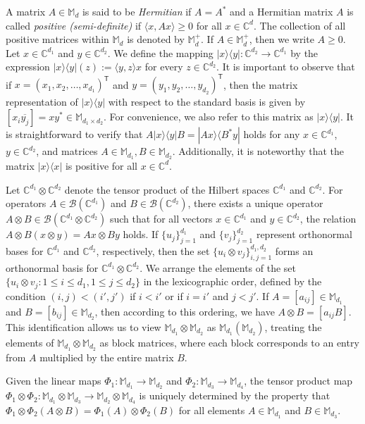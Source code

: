 \documentclass[10pt,reqno]{amsart}
\theoremstyle{definition}
\theoremstyle{plain}
\theoremstyle{remark}
\renewcommand{\sf}[1]{\textsf{#1}}
\newcommand{\mbb}[1]{\mathbb{#1}}
\newcommand{\msc}[1]{\mathscr{#1}}
\newcommand{\M}[1]{\mbb{M}_{#1}}%
\newcommand{\B}[1]{\msc{B}({#1})}
\newcommand{\ranko}[2]{|{#1}\rangle\langle{#2}|}
\newcommand{\ip}[1]{\langle#1\rangle}
\DeclareMathOperator{\T}{\sf{T}}
\numberwithin{equation}{section}%
\begin{document}
A matrix $A\in\M{d}$ is said to be \textit{Hermitian} if $A=A^*$ and a Hermitian matrix $A$ is called \textit{positive (semi-definite)} if $\ip{x,Ax}\geq 0$ for all $x\in \mbb{C}^d$. The collection of all positive matrices within $\M{d}$ is denoted by $\M{d}^+$. If $A\in\M{d}^+$, then we write $A\geq 0$. Let $x\in\mbb{C}^{d_1}$ and $y\in\mbb{C}^{d_2}$. We define the mapping $\ranko{x}{y}:\mbb{C}^{d_2}\to\mbb{C}^{d_1}$ by the expression $\ranko{x}{y}(z):=\ip{y,z}x$ for every $z\in\mbb{C}^{d_2}$. It is important to observe that if $x=(x_1,x_2,\ldots,x_{d_1})^{\T}$ and $y=(y_1,y_2,\ldots,y_{d_2})^{\T}$, then the matrix representation of $\ranko{x}{y}$ with respect to the standard basis is given by $[x_i\overline{y_j}]=xy^*\in\M{d_1\times d_2}$. For convenience, we also refer to this matrix as $\ranko{x}{y}$. It is straightforward to verify that $A\ranko{x}{y}B=\ranko{Ax}{B^*y}$ holds for any $x\in\mbb{C}^{d_1}$, $y\in\mbb{C}^{d_2}$, and matrices $A\in\M{d_1}, B\in\M{d_2}$. Additionally, it is noteworthy that the matrix $\ranko{x}{x}$ is positive for all $x\in\mbb{C}^{d}$.



Let $\mbb{C}^{d_1}\otimes\mbb{C}^{d_2}$ denote the tensor product of the Hilbert spaces $\mbb{C}^{d_1}$ and $\mbb{C}^{d_2}$. For operators $A\in\B{\mbb{C}^{d_1}}$ and $B\in\B{\mbb{C}^{d_2}}$, there exists a unique operator $A\otimes B\in\B{\mbb{C}^{d_1}\otimes \mbb{C}^{d_2}}$ such that for all vectors $x\in\mbb{C}^{d_1}$ and $y\in\mbb{C}^{d_2}$, the relation $A\otimes B(x\otimes y)=Ax\otimes By$ holds. If $\{u_j\}_{j=1}^{d_1}$ and $\{v_j\}_{j=1}^{d_2}$ represent orthonormal bases for $\mbb{C}^{d_1}$ and $\mbb{C}^{d_2}$, respectively, then the set $\{u_i\otimes v_j\}_{i,j=1}^{d_1,d_2}$ forms an orthonormal basis for $\mbb{C}^{d_1}\otimes\mbb{C}^{d_2}$. We arrange the elements of the set $\{u_i\otimes v_j :1\leq i\leq d_1, 1\leq j\leq d_2\}$ in the lexicographic order, defined by the condition $(i, j) < (i',j')$ if $i < i'$ or if $i = i'$ and $j < j'$. If $A=[a_{ij}]\in\M{d_1}$ and $B=[b_{ij}]\in\M{d_2}$, then according to this ordering, we have $A\otimes B=[a_{ij}B]$. This identification allows us to view $\M{d_1}\otimes\M{d_2}$ as $\M{d_1}(\M{d_2})$, treating the elements of $\M{d_1}\otimes\M{d_2}$ as block matrices, where each block corresponds to an entry from $A$ multiplied by the entire matrix $B$.



Given the linear maps $\Phi_1:\M{d_1}\to\M{d_2}$ and $\Phi_2:\M{d_3}\to\M{d_4}$, the tensor product map $\Phi_1\otimes\Phi_2:\M{d_1}\otimes\M{d_3}\to\M{d_2}\otimes\M{d_4}$ is uniquely determined by the property that $\Phi_1\otimes\Phi_2(A\otimes B)=\Phi_1(A)\otimes\Phi_2(B)$ for all elements $A\in\M{d_1}$ and $B\in\M{d_3}$.
\end{document}
